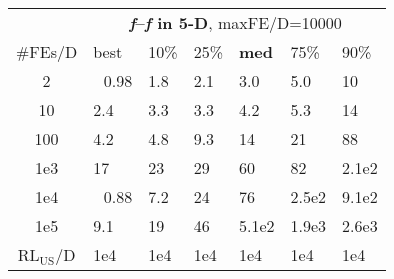 \begin{tabular}{c|llllll}
 & \multicolumn{6}{|c}{\textbf{\textit{f}\raisebox{-0.35ex}{1}--\textit{f}\raisebox{-0.35ex}{24} in 5-D}, maxFE/D=10000}\\
\#FEs/D & best & 10\% & 25\% & \textbf{med} & 75\% & 90\%\\
2 & ~\,0.98 & \hspace*{1ex}1.8 & \hspace*{1ex}2.1 & \hspace*{1ex}3.0 & \hspace*{1ex}5.0 & 10\\
10 & \hspace*{1ex}2.4 & \hspace*{1ex}3.3 & \hspace*{1ex}3.3 & \hspace*{1ex}4.2 & \hspace*{1ex}5.3 & 14\\
100 & \hspace*{1ex}4.2 & \hspace*{1ex}4.8 & \hspace*{1ex}9.3 & 14 & 21 & 88\\
1e3 & 17 & 23 & 29 & 60 & 82 & 2.1e2\\
1e4 & ~\,0.88 & \hspace*{1ex}7.2 & 24 & 76 & 2.5e2 & 9.1e2\\
1e5 & \hspace*{1ex}9.1 & 19 & 46 & 5.1e2 & 1.9e3 & 2.6e3\\
$\text{RL}_{\text{US}}$/D & 1e4 & 1e4 & 1e4 & 1e4 & 1e4 & 1e4
\end{tabular}
